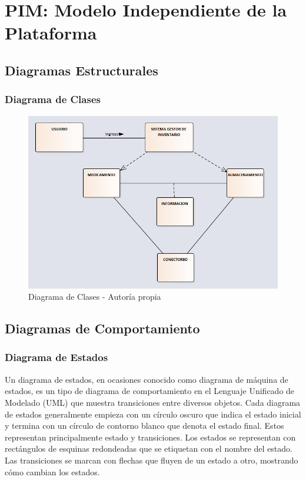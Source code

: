 \section{PIM: Modelo Independiente de la Plataforma}

\subsection{Diagramas Estructurales}

\subsubsection{Diagrama de Clases}

\begin{center}
    \begin{figure}[htb]
        \centering
        \includegraphics[width = 1.0\linewidth] {libro/capitulo5/img/Clases.PNG}
        \caption{Diagrama de Clases - Autor\'ia propia}
        \label{fig:my_label}
    \end{figure}
\end{center}

\subsection{ Diagramas de Comportamiento}
\subsubsection{ Diagrama de Estados}
Un diagrama de estados, en ocasiones conocido como diagrama de máquina de estados, es un tipo de diagrama de comportamiento en el Lenguaje Unificado de Modelado (UML) que muestra transiciones entre diversos objetos.
\newline
Cada diagrama de estados generalmente empieza con un círculo oscuro que indica el estado inicial y termina con un círculo de contorno blanco que denota el estado final. Estos representan principalmente estado y transiciones. Los estados se representan con rectángulos de esquinas redondeadas que se etiquetan con el nombre del estado. Las transiciones se marcan con flechas que fluyen de un estado a otro, mostrando cómo cambian los estados.


